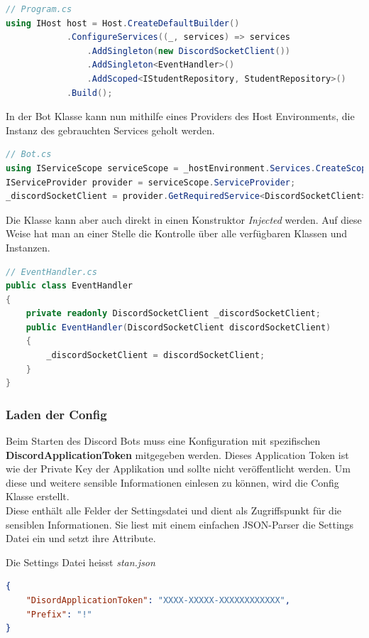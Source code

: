 \documentclass[a4paper, table]{article}
\begin{document}
\begin{lstlisting}[language=csharp]
// Program.cs
using IHost host = Host.CreateDefaultBuilder()
            .ConfigureServices((_, services) => services
                .AddSingleton(new DiscordSocketClient())
                .AddSingleton<EventHandler>()
                .AddScoped<IStudentRepository, StudentRepository>()
            .Build();
\end{lstlisting}

In der Bot Klasse kann nun mithilfe eines Providers des Host Environments, die Instanz des gebrauchten Services geholt werden.

\begin{lstlisting}[language=csharp]
// Bot.cs
using IServiceScope serviceScope = _hostEnvironment.Services.CreateScope();
IServiceProvider provider = serviceScope.ServiceProvider;
_discordSocketClient = provider.GetRequiredService<DiscordSocketClient>();
\end{lstlisting}

Die Klasse kann aber auch direkt in einen Konstruktor \textit{Injected} werden.
Auf diese Weise hat man an einer Stelle die Kontrolle über alle verfügbaren Klassen und Instanzen.
\begin{lstlisting}[language=csharp]
// EventHandler.cs
public class EventHandler
{
    private readonly DiscordSocketClient _discordSocketClient;
    public EventHandler(DiscordSocketClient discordSocketClient)
    {
        _discordSocketClient = discordSocketClient;
    }
}
\end{lstlisting}

\subsubsection*{Laden der Config}
Beim Starten des Discord Bots muss eine Konfiguration mit spezifischen \textbf{DiscordApplicationToken} mitgegeben werden.
Dieses Application Token ist wie der Private Key der Applikation und sollte nicht veröffentlicht werden.
Um diese und weitere sensible Informationen einlesen zu können, wird die Config Klasse erstellt.\\
Diese enthält alle Felder der Settingsdatei und dient als Zugriffspunkt für die sensiblen Informationen.
Sie liest mit einem einfachen JSON-Parser die Settings Datei ein und setzt ihre Attribute.

Die Settings Datei heisst \textit{stan.json}
\begin{lstlisting}[language=json]
{
    "DisordApplicationToken": "XXXX-XXXXX-XXXXXXXXXXXX",
    "Prefix": "!"
}
\end{lstlisting}
\end{document}
